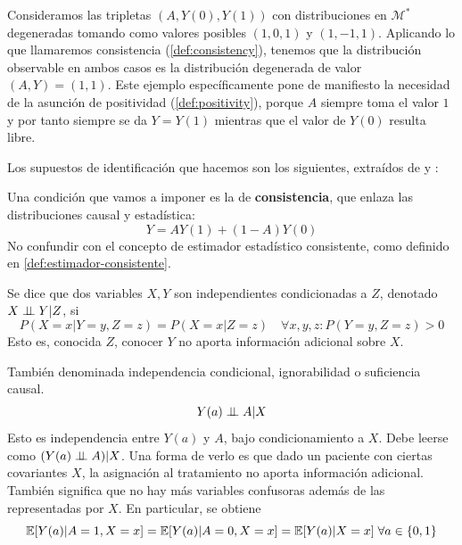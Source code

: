 \begin{ejemplo}\cite[sección 2.2]{mci}
    Consideramos las tripletas $(A, Y(0),Y(1))$ con distribuciones en $\mathcal{M}^*$
    degeneradas tomando como valores posibles $(1, 0, 1)$ y $(1, -1, 1)$. Aplicando
    lo que llamaremos consistencia (\autoref{def:consistency}),
    tenemos que la distribución observable en ambos casos es la distribución degenerada de valor
    $(A, Y) = (1, 1)$.
    Este ejemplo específicamente pone de manifiesto la necesidad de la asunción de positividad
    (\autoref{def:positivity}),
    porque $A$ siempre toma el valor $1$ y por tanto siempre
    se da $Y = Y(1)$ mientras que el valor de $Y(0)$ resulta libre.
\end{ejemplo}

Los supuestos de identificación que hacemos son los siguientes, extraídos
de \cite[material suplementario S1]{luque2021} y \cite[capítulo 2.2]{mci}:

\begin{definicion}[Consistencia]
    \label{def:consistency}
    Una condición que vamos a imponer es la de \textbf{consistencia}, que enlaza
    las distribuciones causal y estadística:
    \[ Y = A Y(1) + (1 - A)Y(0) \]
    No confundir con el concepto de estimador estadístico consistente,
    como definido en \autoref{def:estimador-consistente}.
\end{definicion}

\begin{definicion} \cite[1.1.5]{pearl2009causality}
    Se dice que dos variables $X, Y$ son independientes condicionadas a $Z$, denotado
    $X \mathrel{\perp\!\!\!\perp} Y | Z$, si
    \[
        P(X = x | Y = y, Z = z) = P(X = x | Z = z) \quad \forall x, y, z: P(Y = y, Z = z) > 0
    \]
    Esto es, conocida $Z$, conocer $Y$ no aporta información adicional sobre $X$.
\end{definicion}

\begin{definicion} \label{def:intercambiabilidad}
    También denominada independencia condicional, ignorabilidad o suficiencia causal.
    \[ Y(a) \mathrel{\perp\!\!\!\perp} A | X \]
    Esto es independencia entre $Y(a)$ y $A$, bajo condicionamiento a $X$. Debe leerse como
    $(Y(a) \mathrel{\perp\!\!\!\perp} A) | X$.
    Una forma de verlo es que dado un paciente con ciertas covariantes $X$, la asignación al
    tratamiento no aporta información adicional.
    También significa que no hay más variables confusoras además de las representadas por $X$. %
    En particular, se obtiene
    \[
        \mathbb{E}[Y(a) | A = 1, X = x] = \mathbb{E}[Y(a) | A = 0, X = x] = \mathbb{E}[Y(a) | X = x] \;\forall a \in \{0, 1\}
    \]
\end{definicion}

